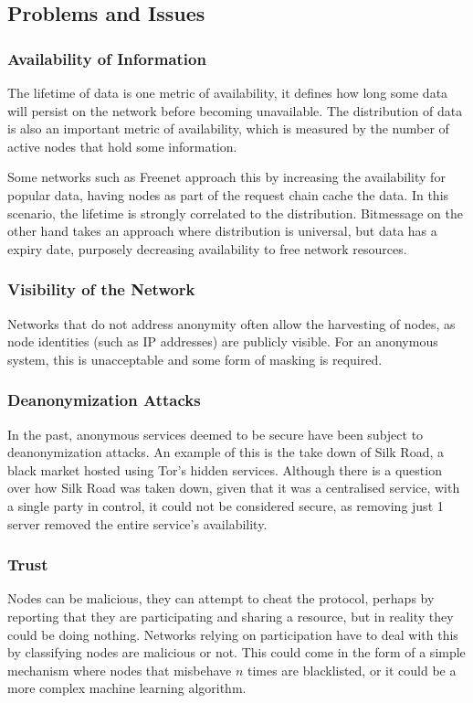 	\subsection{Problems and Issues}
		\subsubsection*{Availability of Information}
			The lifetime of data is one metric of availability, it defines how long some data will persist on the network before becoming unavailable. The distribution of data is also an important metric of availability, which is measured by the number of active nodes that hold some information.
			
			Some networks such as Freenet approach this by increasing the availability for popular data, having nodes as part of the request chain cache the data. In this scenario, the lifetime is strongly correlated to the distribution. Bitmessage on the other hand takes an approach where distribution is universal, but data has a expiry date, purposely decreasing availability to free network resources.
		\subsubsection*{Visibility of the Network}
			Networks that do not address anonymity often allow the harvesting of nodes, as node identities (such as IP addresses) are publicly visible. For an anonymous system, this is unacceptable and some form of masking is required.
		\subsubsection*{Deanonymization Attacks}
			In the past, anonymous services deemed to be secure have been subject to deanonymization attacks. An example of this is the take down of Silk Road, a black market hosted using Tor's hidden services. Although there is a question over how Silk Road was taken down, given that it was a centralised service, with a single party in control, it could not be considered secure, as removing just 1 server removed the entire service's availability. 
			
		\subsubsection*{Trust}
			Nodes can be malicious, they can attempt to cheat the protocol, perhaps by reporting that they are participating and sharing a resource, but in reality they could be doing nothing. Networks relying on participation have to deal with this by classifying nodes are malicious or not. This could come in the form of a simple mechanism where nodes that misbehave $n$ times are blacklisted, or it could be a more complex machine learning algorithm.
